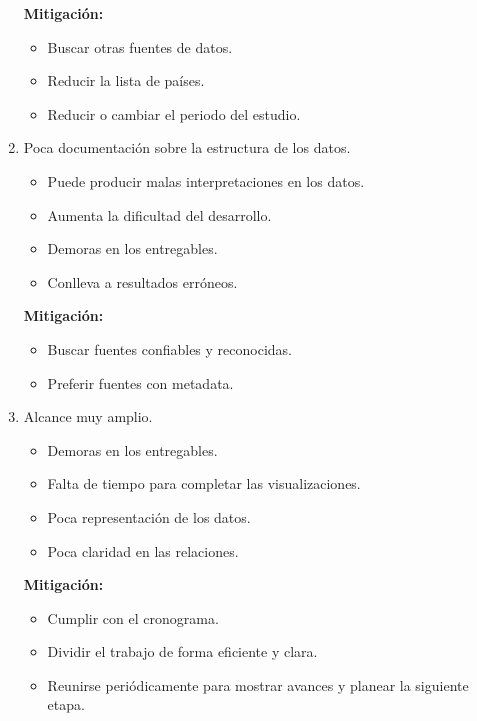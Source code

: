 \documentclass{article}
\begin{document}
\begin{enumerate}
\textbf{Mitigación:}

\begin{itemize}
    \item Buscar otras fuentes de datos.
    \item Reducir la lista de países.
    \item Reducir o cambiar el periodo del estudio. 
\end{itemize}
  
    
\item Poca documentación sobre la estructura de los datos.
\begin{itemize}
    \item Puede producir malas interpretaciones en los datos.
    \item Aumenta la dificultad del desarrollo.
    \item Demoras en los entregables.
    \item Conlleva a resultados erróneos.
\end{itemize}
    
\textbf{Mitigación:}
\begin{itemize}
    \item Buscar fuentes confiables y reconocidas.
    \item Preferir fuentes con metadata.
\end{itemize}


\newpage 

\item Alcance muy amplio.
\begin{itemize}
    \item Demoras en los entregables.
    \item Falta de tiempo para completar las visualizaciones.
    \item Poca representación de los datos.
    \item Poca claridad en las relaciones.
\end{itemize}
   
    
\textbf{Mitigación:}
    \begin{itemize}
        \item Cumplir con el cronograma.
        \item Dividir el trabajo de forma eficiente y clara.
        \item Reunirse periódicamente para mostrar avances y planear la siguiente etapa.
    \end{itemize}
    
\end{enumerate}
\end{document}
